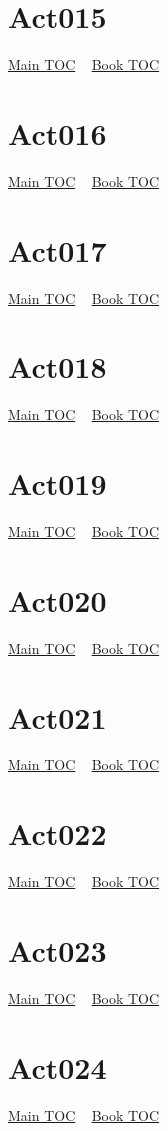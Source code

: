 \documentclass{book}
\begin{document}
  \section{Act015}\hyperlink{toc}{Main TOC} ~ \hyperref[subsec:Act]{Book TOC} 
  \section{Act016}\hyperlink{toc}{Main TOC} ~ \hyperref[subsec:Act]{Book TOC} 
  \section{Act017}\hyperlink{toc}{Main TOC} ~ \hyperref[subsec:Act]{Book TOC} 
  \section{Act018}\hyperlink{toc}{Main TOC} ~ \hyperref[subsec:Act]{Book TOC} 
  \section{Act019}\hyperlink{toc}{Main TOC} ~ \hyperref[subsec:Act]{Book TOC} 
  \section{Act020}\hyperlink{toc}{Main TOC} ~ \hyperref[subsec:Act]{Book TOC} 
  \section{Act021}\hyperlink{toc}{Main TOC} ~ \hyperref[subsec:Act]{Book TOC} 
  \section{Act022}\hyperlink{toc}{Main TOC} ~ \hyperref[subsec:Act]{Book TOC} 
  \section{Act023}\hyperlink{toc}{Main TOC} ~ \hyperref[subsec:Act]{Book TOC} 
  \section{Act024}\hyperlink{toc}{Main TOC} ~ \hyperref[subsec:Act]{Book TOC} 
\end{document}
